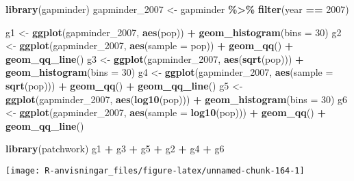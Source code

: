 \documentclass[
]{book}
\newenvironment{Shaded}{\begin{snugshade}}{\end{snugshade}}
\newcommand{\AttributeTok}[1]{\textcolor[rgb]{0.13,0.29,0.53}{#1}}
\newcommand{\DecValTok}[1]{\textcolor[rgb]{0.00,0.00,0.81}{#1}}
\newcommand{\FunctionTok}[1]{\textcolor[rgb]{0.13,0.29,0.53}{\textbf{#1}}}
\newcommand{\NormalTok}[1]{#1}
\newcommand{\OtherTok}[1]{\textcolor[rgb]{0.56,0.35,0.01}{#1}}
\newcommand{\SpecialCharTok}[1]{\textcolor[rgb]{0.81,0.36,0.00}{\textbf{#1}}}
\theoremstyle{definition}
\theoremstyle{definition}
\theoremstyle{definition}
\theoremstyle{definition}
\theoremstyle{remark}
\begin{document}
\begin{Shaded}
\begin{Highlighting}[]
\FunctionTok{library}\NormalTok{(gapminder)}
\NormalTok{gapminder\_2007 }\OtherTok{\textless{}{-}}\NormalTok{ gapminder }\SpecialCharTok{\%\textgreater{}\%} \FunctionTok{filter}\NormalTok{(year }\SpecialCharTok{==} \DecValTok{2007}\NormalTok{)}

\NormalTok{g1 }\OtherTok{\textless{}{-}} \FunctionTok{ggplot}\NormalTok{(gapminder\_2007, }\FunctionTok{aes}\NormalTok{(pop)) }\SpecialCharTok{+} \FunctionTok{geom\_histogram}\NormalTok{(}\AttributeTok{bins =} \DecValTok{30}\NormalTok{)}
\NormalTok{g2 }\OtherTok{\textless{}{-}} \FunctionTok{ggplot}\NormalTok{(gapminder\_2007, }\FunctionTok{aes}\NormalTok{(}\AttributeTok{sample =}\NormalTok{ pop)) }\SpecialCharTok{+} \FunctionTok{geom\_qq}\NormalTok{() }\SpecialCharTok{+} \FunctionTok{geom\_qq\_line}\NormalTok{()}
\NormalTok{g3 }\OtherTok{\textless{}{-}} \FunctionTok{ggplot}\NormalTok{(gapminder\_2007, }\FunctionTok{aes}\NormalTok{(}\FunctionTok{sqrt}\NormalTok{(pop))) }\SpecialCharTok{+} \FunctionTok{geom\_histogram}\NormalTok{(}\AttributeTok{bins =} \DecValTok{30}\NormalTok{)}
\NormalTok{g4 }\OtherTok{\textless{}{-}} \FunctionTok{ggplot}\NormalTok{(gapminder\_2007, }\FunctionTok{aes}\NormalTok{(}\AttributeTok{sample =} \FunctionTok{sqrt}\NormalTok{(pop))) }\SpecialCharTok{+} \FunctionTok{geom\_qq}\NormalTok{() }\SpecialCharTok{+} \FunctionTok{geom\_qq\_line}\NormalTok{()}
\NormalTok{g5 }\OtherTok{\textless{}{-}} \FunctionTok{ggplot}\NormalTok{(gapminder\_2007, }\FunctionTok{aes}\NormalTok{(}\FunctionTok{log10}\NormalTok{(pop))) }\SpecialCharTok{+} \FunctionTok{geom\_histogram}\NormalTok{(}\AttributeTok{bins =} \DecValTok{30}\NormalTok{)}
\NormalTok{g6 }\OtherTok{\textless{}{-}} \FunctionTok{ggplot}\NormalTok{(gapminder\_2007, }\FunctionTok{aes}\NormalTok{(}\AttributeTok{sample =} \FunctionTok{log10}\NormalTok{(pop))) }\SpecialCharTok{+} \FunctionTok{geom\_qq}\NormalTok{() }\SpecialCharTok{+} \FunctionTok{geom\_qq\_line}\NormalTok{()}

\FunctionTok{library}\NormalTok{(patchwork)}
\NormalTok{g1 }\SpecialCharTok{+}\NormalTok{ g3 }\SpecialCharTok{+}\NormalTok{ g5 }\SpecialCharTok{+}\NormalTok{ g2 }\SpecialCharTok{+}\NormalTok{ g4 }\SpecialCharTok{+}\NormalTok{ g6}
\end{Highlighting}
\end{Shaded}

\begin{center}\texttt{[image: R-anvisningar\_files/figure-latex/unnamed-chunk-164-1]} \end{center}
\end{document}
